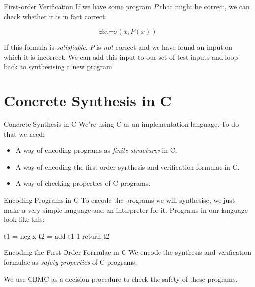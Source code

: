 \documentclass[xcolor=pdftex,t,11pt]{beamer}
\begin{document}
\begin{frame}{First-order Verification}
 If we have some program $P$ that might be correct, we can check whether it is in fact correct:
 
 $$\exists x . \lnot \sigma(x, P(x))$$
 
 If this formula is \emph{satisfiable}, $P$ is \emph{not} correct and we have found an input on which it is incorrect.
 We can add this input to our set of test inputs and loop back to synthesising a new program.
\end{frame}

\section{Concrete Synthesis in C}
\begin{frame}{Concrete Synthesis in C}
 We're using C as an implementation language.  To do that we need:
 
 \begin{itemize}
  \item A way of encoding programs as \emph{finite structures} in C.
  \item A way of encoding the first-order synthesis and verification formulae in C.
  \item A way of checking properties of C programs.
 \end{itemize}
\end{frame}

\begin{frame}[fragile]{Encoding Programs in C}
 To encode the programs we will synthesise, we just make a very simple language and an interpreter for it.  Programs
 in our language look like this:
 
 \vspace{0.7cm}

\begin{center}
\begin{minipage}{0.3\linewidth}
\begin{verbatimtab}
t1 = neg x
t2 = add t1 1
return t2
\end{verbatimtab}
\end{minipage}
\end{center}

\end{frame}

\begin{frame}{Encoding the First-Order Formulae in C}
 We encode the synthesis and verification formulae as \emph{safety properties} of C programs.
 
 We use CBMC as a decision procedure to check the safety of these programs.
\end{frame}
\end{document}
